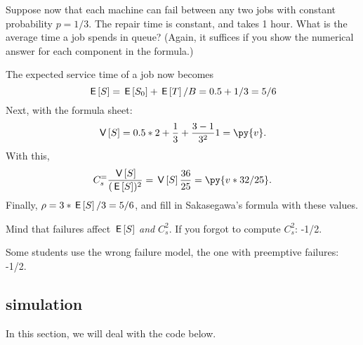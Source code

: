\begin{exercise}[201807]
Suppose now that each machine can fail between any two jobs with constant probability $p=1/3$. The repair time is constant, and takes 1 hour. What is the average time a job spends in queue? (Again, it suffices if you show the numerical answer for each component in the formula.)
\begin{solution}
 The expected service time of a job now becomes 
 \begin{equation*}
 \,\mathsf{E}\left[S\right] = \,\mathsf{E}\left[S_0\right] + \,\mathsf{E}\left[T\right]/B = 0.5 + 1/3 = 5/6
 \end{equation*}
Next, with the formula sheet: 
\begin{equation*}
\V{S} = 0.5*2 + \frac 1 3 + \frac{3-1}{3^2} 1 = \py{v}.
\end{equation*}
With this, 
\begin{equation*}
 C_s^ = \frac{\V{S}}{(\E S)^2} = \V{S}\frac{36}{25} = \py{v*32/25}.
\end{equation*}
Finally, $\rho = 3*\,\mathsf{E}\left[S\right] / 3 = 5/6$, and fill in Sakasegawa's formula with these values.

Mind that failures affect $\,\mathsf{E}\left[S\right]$ \emph{and} $C_s^2$. If you forgot to compute $C_s^2$: -1/2.

Some students use the wrong failure model, the one with preemptive failures: -1/2.
\end{solution}
\end{exercise}


\subsection{simulation}
\label{sec:simulation}


In this section, we will deal with the code below.

